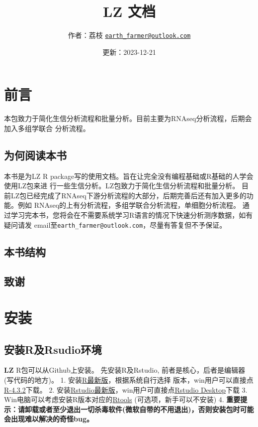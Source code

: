 \documentclass[
]{book}
\title{LZ 文档}
\author{作者：荔枝 \href{mailto:earth_farmer@outlook.com}{\nolinkurl{earth\_farmer@outlook.com}}}
\date{更新：2023-12-21}
\begin{document}
\maketitle

{
\setcounter{tocdepth}{1}
\tableofcontents
}
\chapter*{前言}\label{ux524dux8a00}

本包致力于简化生信分析流程和批量分析。目前主要为RNAseq分析流程，后期会加入多组学联合
分析流程。

\section*{为何阅读本书}\label{ux4e3aux4f55ux9605ux8bfbux672cux4e66}

本书是为LZ R package写的使用文档。旨在让完全没有编程基础或R基础的人学会使用LZ包来进
行一些生信分析。LZ包致力于简化生信分析流程和批量分析。
目前LZ包已经完成了RNAseq下游分析流程的大部分，后期完善后还有加入更多的功能。例如
RNAseq的上有分析流程，多组学联合分析流程，单细胞分析流程。
通过学习完本书，您将会在不需要系统学习R语言的情况下快速分析测序数据，如有疑问请发
email至\texttt{earth\_farmer@outlook.com}，尽量有答复但不予保证。

\section*{本书结构}\label{ux672cux4e66ux7ed3ux6784}

\section*{致谢}\label{ux81f4ux8c22}

\chapter{安装}\label{install}

\section{安装R及Rsudio环境}\label{ux5b89ux88c5rux53carsudioux73afux5883}

\textbf{LZ} R包可以从Github上安装。
先安装R及Rstudio, 前者是核心，后者是编辑器(写代码的地方)。
1. 安装\href{https://mirrors.tuna.tsinghua.edu.cn/CRAN/bin/}{R最新版}，根据系统自行选择
版本，win用户可以直接点\href{https://mirrors.tuna.tsinghua.edu.cn/CRAN/bin/windows/base/R-4.3.2-win.exe}{R-4.3.2}下载。
2. 安装\href{https://posit.co/download/rstudio-desktop/}{Rstudio最新版}，win用户可直接点\href{https://download1.rstudio.org/electron/windows/RStudio-2023.09.1-494.exe}{Rstudio Desktop}下载
3. Win电脑可以考虑安装R版本对应的\href{https://cran.r-project.org/bin/windows/Rtools/}{Rtools} (可选项，新手可以不安装)
4. \textbf{重要提示：请卸载或者至少退出一切杀毒软件(微软自带的不用退出)，否则安装包时可能会出现难以解决的奇怪bug。}
\end{document}

